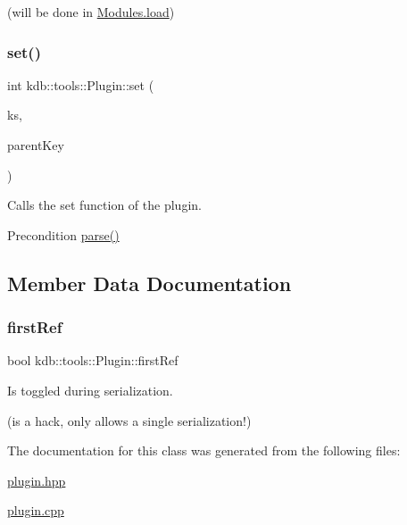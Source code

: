(will be done in \mbox{\hyperlink{classkdb_1_1tools_1_1Modules_ae8d8c91745c9f517e6e8a556f1664f69}{Modules.\+load}}) \mbox{\label{classkdb_1_1tools_1_1Plugin_abf84d512b48f6fa1b89636217537cde0}} 
\subsubsection{\texorpdfstring{set()}{set()}}
{\footnotesize\ttfamily int kdb\+::tools\+::\+Plugin\+::set (\begin{DoxyParamCaption}\item[{\mbox{\hyperlink{classkdb_1_1KeySet}{kdb\+::\+Key\+Set}} \&}]{ks,  }\item[{\mbox{\hyperlink{classkdb_1_1Key}{kdb\+::\+Key}} \&}]{parent\+Key }\end{DoxyParamCaption})}



Calls the set function of the plugin. 

\begin{DoxyPrecond}{Precondition}
\mbox{\hyperlink{classkdb_1_1tools_1_1Plugin_adfcba2fbdeb436a1083410df804d5fb0}{parse()}} 
\end{DoxyPrecond}


\subsection{Member Data Documentation}
\mbox{\label{classkdb_1_1tools_1_1Plugin_aee8ae2b5708c74d4ccdc1bf9e8794636}} 
\subsubsection{\texorpdfstring{firstRef}{firstRef}}
{\footnotesize\ttfamily bool kdb\+::tools\+::\+Plugin\+::first\+Ref}



Is toggled during serialization. 

(is a hack, only allows a single serialization!) 

The documentation for this class was generated from the following files\+:\begin{DoxyCompactItemize}
\item 
\mbox{\hyperlink{plugin_8hpp}{plugin.\+hpp}}\item 
\mbox{\hyperlink{plugin_8cpp}{plugin.\+cpp}}\end{DoxyCompactItemize}
